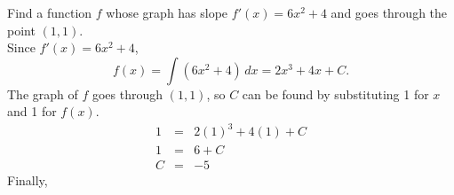 \documentclass{book}
\DeclareMathOperator{\arcsec}{arcsec}
\newcommand{\dx}{\,dx}
\newcommand{\dint}{\displaystyle \int}
\begin{document}




\begin{Exam} Find a function $f$ whose graph has slope $f' (x) = 6x^2 +4$ and goes through the point $(1,1)$.\\

Since $f'(x) = 6x^2 + 4$, \[f(x) = \int (6x^2+4)\dx = 2x^3 + 4x  + C.\] The graph of $f$ goes through $(1,1)$, so $C$ can be found by substituting 1 for $x$ and 1 for $f(x)$. 
\begin{eqnarray*}
1 &=& 2(1)^3 + 4(1) + C\\
1 &=& 6 + C\\
C&=& -5
\end{eqnarray*} Finally, 
\end{Exam}\vs
\end{document}
